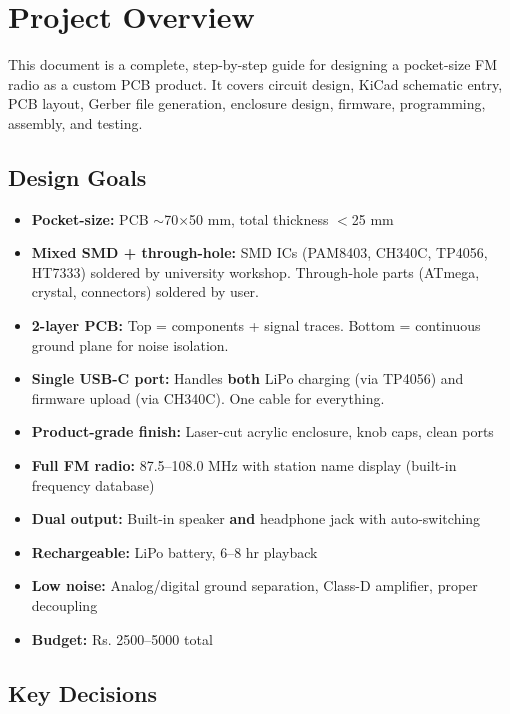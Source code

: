 \documentclass[a4paper,11pt]{article}
\renewcommand*{\,}{ }%
\begin{document}
\section{Project Overview}

This document is a complete, step-by-step guide for designing a pocket-size FM radio as a custom PCB product. It covers circuit design, KiCad schematic entry, PCB layout, Gerber file generation, enclosure design, firmware, programming, assembly, and testing.

\subsection{Design Goals}
\begin{itemize}[noitemsep]
    \item \textbf{Pocket-size:} PCB $\sim$70$\times$50\,mm, total thickness $<$25\,mm
    \item \textbf{Mixed SMD + through-hole:} SMD ICs (PAM8403, CH340C, TP4056, HT7333) soldered by university workshop. Through-hole parts (ATmega, crystal, connectors) soldered by user.
    \item \textbf{2-layer PCB:} Top = components + signal traces. Bottom = continuous ground plane for noise isolation.
    \item \textbf{Single USB-C port:} Handles \textbf{both} LiPo charging (via TP4056) and firmware upload (via CH340C). One cable for everything.
    \item \textbf{Product-grade finish:} Laser-cut acrylic enclosure, knob caps, clean ports
    \item \textbf{Full FM radio:} 87.5--108.0\,MHz with station name display (built-in frequency database)
    \item \textbf{Dual output:} Built-in speaker \textbf{and} headphone jack with auto-switching
    \item \textbf{Rechargeable:} LiPo battery, 6--8\,hr playback
    \item \textbf{Low noise:} Analog/digital ground separation, Class-D amplifier, proper decoupling
    \item \textbf{Budget:} Rs.\,2500--5000 total
\end{itemize}

\subsection{Key Decisions}
\end{document}
